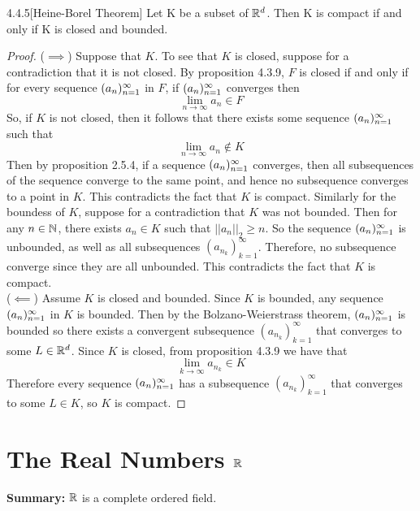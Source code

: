 \documentclass[openany]{report}
\begin{document}
\begin{manualtheorem}{4.4.5}[Heine-Borel Theorem]
    Let K be a subset of $\mathbb{R}^d$. Then K is compact if and only if K is closed and bounded.
\end{manualtheorem}
\begin{proof}
   ($\implies$) Suppose that $K$. To see that $K$ is closed, suppose for a contradiction that it is not closed. By proposition 4.3.9, $F$ is closed if and only if for every sequence $({a}_n)_{n=1}^\infty$ in $F$, if $({a}_n)_{n=1}^\infty$ converges then 
   \[\lim_{n\rightarrow \infty} a_n \in F\]
   So, if $K$ is not closed, then it follows that there exists some sequence $({a}_n)_{n=1}^\infty$ such that 
   \[\lim_{n\rightarrow\infty} a_n \not\in K\]
   Then by proposition 2.5.4, if a sequence $({a}_n)_{n=1}^\infty$ converges, then all subsequences of the sequence converge to the same point, and hence no subsequence converges to a point in $K$. This contradicts the fact that $K$ is compact. Similarly for the boundess of $K$, suppose for a contradiction that $K$ was not bounded. Then for any $n \in \mathbb{N}$, there exists $a_n \in K$ such that $||a_n||_2 \geq n$. So the sequence $({a}_n)_{n=1}^\infty$ is unbounded, as well as all subsequences $(a_{n_k})^\infty_{k=1}$. Therefore, no subsequence converge since they are all unbounded. This contradicts the fact that $K$ is compact.\\[2ex]
   ($\impliedby$) Assume $K$ is closed and bounded. Since $K$ is bounded, any sequence $({a}_n)_{n=1}^\infty$ in $K$ is bounded. Then by the Bolzano-Weierstrass theorem, $({a}_n)_{n=1}^\infty$ is bounded so there exists a convergent subsequence $(a_{n_k})_{k=1}^\infty$ that converges to some $L \in \mathbb{R}^d$. Since $K$ is closed, from proposition 4.3.9 we have that 
   \[\lim_{k\rightarrow\infty} a_{n_k} \in K\]
   Therefore every sequence $({a}_n)_{n=1}^\infty$ has a subsequence $(a_{n_k})_{k=1}^\infty$ that converges to some $L \in K$, so $K$ is compact.
\end{proof}
    




\chapter{The Real Numbers $\mathbb{R}$}
\begin{center}
    \textbf{Summary:} $\mathbb{R}$ is a complete ordered field.
\end{center}
\end{document}
